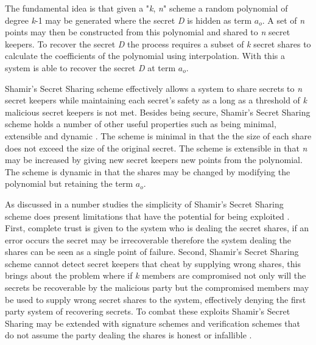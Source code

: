 The fundamental idea is that given a "\textit{k}, \textit{n}" scheme a random polynomial of degree \textit{k}-1 may be generated where the secret \textit{D} is hidden as term \(a_o\). A set of \textit{n} points may then be constructed from this polynomial and shared to \textit{n} secret keepers. To recover the secret \textit{D} the process requires a subset of \textit{k} secret shares to calculate the coefficients of the polynomial using interpolation. With this a system is able to recover the secret \textit{D} at term \(a_o\).
\par
Shamir's Secret Sharing scheme effectively allows a system to share secrets to \textit{n} secret keepers while maintaining each secret's safety as a long as a threshold of \textit{k} malicious secret keepers is not met. Besides being secure, Shamir's Secret Sharing scheme holds a number of other useful properties such as being minimal, extensible and dynamic \cite{shamir1979share}. The scheme is minimal in that the the size of each share does not exceed the size of the original secret. The scheme is extensible in that \textit{n} may be increased by giving new secret keepers new points from the polynomial. The scheme is dynamic in that the shares may be changed by modifying the polynomial but retaining the term \(a_o\).
\par
As discussed in a number studies the simplicity of Shamir's Secret Sharing scheme does present limitations that have the potential for being exploited \cite{abdallah2015analysis}\cite{dautrich2012security}. First, complete trust is given to the system who is dealing the secret shares, if an error occurs the secret may be irrecoverable therefore the system dealing the shares can be seen as a single point of failure. Second, Shamir's Secret Sharing scheme cannot detect secret keepers that cheat by supplying wrong shares, this brings about the problem where if \textit{k} members are compromised not only will the secrets be recoverable by the malicious party but the compromised members may be used to supply wrong secret shares to the system, effectively denying the first party system of recovering secrets. To combat these exploits Shamir's Secret Sharing may be extended with signature schemes \cite{shoup2000practical}\cite{abdalla2001forward} and verification schemes that do not assume the party dealing the shares is honest or infallible \cite{herzberg1995proactive}\cite{cachin2002asynchronous}.
